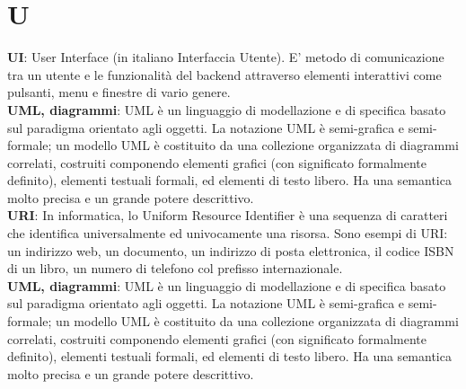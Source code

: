 \section{U}
\textbf{UI}: User Interface (in italiano Interfaccia Utente). E' metodo di comunicazione tra un utente e le funzionalità del backend attraverso elementi interattivi come pulsanti, menu e finestre di vario genere.\\
\textbf{UML, diagrammi}: UML è un linguaggio di modellazione e di specifica basato sul paradigma orientato agli oggetti.
 La notazione UML è semi-grafica e semi-formale; un modello UML è costituito da una collezione organizzata di diagrammi correlati, costruiti componendo elementi grafici (con significato
formalmente definito), elementi testuali formali, ed elementi di testo libero. Ha una semantica molto
precisa e un grande potere descrittivo.\\
\textbf{URI}: In informatica, lo Uniform Resource Identifier è una sequenza di caratteri che identifica universalmente ed univocamente una risorsa. Sono esempi di URI: un indirizzo web, un documento, un indirizzo di posta elettronica, il codice ISBN di un libro, un numero di telefono col prefisso internazionale.\\
 \textbf{UML, diagrammi}: UML è un linguaggio di modellazione e di specifica basato sul paradigma orientato agli oggetti.
La notazione UML è semi-grafica e semi-formale; un modello UML è costituito da una collezione organizzata di diagrammi correlati, costruiti componendo elementi grafici (con significato
formalmente definito), elementi testuali formali, ed elementi di testo libero. Ha una semantica molto
precisa e un grande potere descrittivo.\\
